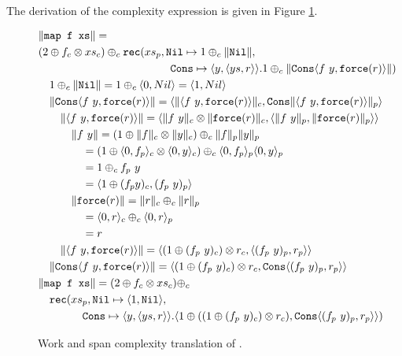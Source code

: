 \paragraph{}
The derivation of the complexity expression is given in Figure \ref{fig:ws_map_complexity_translation}.
%
\begin{figure}
  \label{fig:ws_map_complexity_translation}
  \caption{Work and span complexity translation of .}
  \[\begin{split}
    &\|\texttt{map f xs}\| = \\
    &  (2 \oplus f_c \otimes xs_c) \oplus_c \texttt{rec}(xs_p, \texttt{Nil}\mapsto 1 \oplus_c \|\texttt{Nil}\|, \\
    &\qquad\quad\quad\quad\qquad\quad\quad\quad\qquad \texttt{Cons} \mapsto \langle y, \langle ys, r \rangle \rangle. 1 \oplus_c \|\texttt{Cons}\langle f\ y, \texttt{force}(r)\rangle \|) \\
    &\quad 1 \oplus_c \|\texttt{Nil}\| = 1 \oplus_c \langle 0, Nil \rangle = \langle 1, Nil \rangle \\
    &\quad\|\texttt{Cons}\langle f\ y, \texttt{force}(r)\rangle \| = \langle \|\langle f\ y, \texttt{force}(r)\rangle\|_c, \texttt{Cons} \| \langle f\ y, \texttt{force}(r)\rangle \|_p\rangle \\
    &\qquad \|\langle f\ y, \texttt{force}(r)\rangle\| = \langle \|f\ y\|_c \otimes \|\texttt{force}(r)\|_c, \langle \|f\ y\|_p, \|\texttt{force}(r)\|_p\rangle\rangle \\
    &\qquad\quad \|f\ y\| = (1 \oplus \|f\|_c \otimes \|y\|_c) \oplus_c \|f\|_p \|y\|_p \\
    &\qquad\quad\quad = (1 \oplus \langle 0, f_p \rangle_c \otimes \langle 0, y \rangle_c) \oplus_c \langle 0, f_p \rangle_p \langle 0, y \rangle_p \\
    &\qquad\quad\quad = 1 \oplus_c f_p\ y \\
    &\qquad\quad\quad = \langle 1 \oplus (f_p y)_c, (f_p\ y)_p \rangle \\
    &\qquad\quad \|\texttt{force}(r)\| = \|r\|_c \oplus_c \|r\|_p \\
    &\qquad\quad\quad = \langle 0, r \rangle_c \oplus_c \langle 0, r \rangle_p \\
    &\qquad\quad\quad = r \\
    &\qquad \|\langle f\ y, \texttt{force}(r)\rangle\| = \langle (1 \oplus (f_p\ y)_c) \otimes r_c, \langle (f_p\ y)_p, r_p \rangle \rangle \\
    &\quad\|\texttt{Cons}\langle f\ y, \texttt{force}(r)\rangle \| = \langle (1 \oplus (f_p\ y)_c) \otimes r_c, \texttt{Cons} \langle (f_p\ y)_p, r_p \rangle \rangle \\
    &\|\texttt{map f xs}\| = (2 \oplus f_c \otimes xs_c) \oplus_c \\
    &\quad \texttt{rec}(xs_p, \texttt{Nil}\mapsto \langle 1, \texttt{Nil}\rangle, \\
    &\qquad\quad\quad \texttt{Cons} \mapsto \langle y, \langle ys, r \rangle \rangle. \langle 1 \oplus ((1 \oplus (f_p\ y)_c) \otimes r_c), \texttt{Cons} \langle (f_p\ y)_p, r_p \rangle \rangle)
  \end{split}\]
\end{figure}
